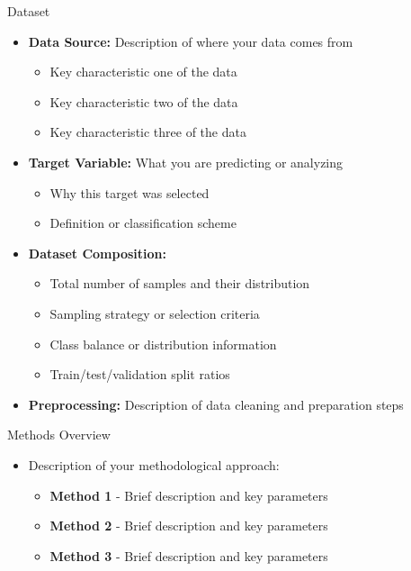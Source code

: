 \documentclass[
    10pt,
    aspectratio=169,
]{beamer}
\begin{document}
\begin{frame}{Dataset}
\begin{itemize}
    \item \textbf{Data Source:} Description of where your data comes from
    \begin{itemize}
        \item Key characteristic one of the data
        \item Key characteristic two of the data
        \item Key characteristic three of the data
    \end{itemize}
    \item \textbf{Target Variable:} What you are predicting or analyzing
    \begin{itemize}
        \item Why this target was selected
        \item Definition or classification scheme
    \end{itemize}
    \item \textbf{Dataset Composition:}
    \begin{itemize}
        \item Total number of samples and their distribution
        \item Sampling strategy or selection criteria
        \item Class balance or distribution information
        \item Train/test/validation split ratios
    \end{itemize}
    \item \textbf{Preprocessing:} Description of data cleaning and preparation steps
\end{itemize}
\end{frame}

\begin{frame}{Methods Overview}
\begin{itemize}
    \item Description of your methodological approach:
    \begin{itemize}
        \item \textbf{Method 1} - Brief description and key parameters
        \item \textbf{Method 2} - Brief description and key parameters
        \item \textbf{Method 3} - Brief description and key parameters
    \end{itemize}
\end{itemize}
\end{frame}
\end{document}
